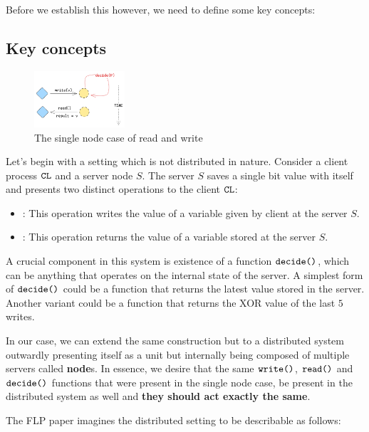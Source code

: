 Before we establish this however, we need to define some key concepts:

\subsection{Key concepts}

\begin{figure}
    \centering
    \includegraphics[width=0.30\textwidth]{general-problems/assets/flp-single-node-read-write.png}
    \caption{The single node case of read and write}
    \label{fig:flp-single-node-read-write}
\end{figure}

Let's begin with a setting which is not distributed in nature. Consider a client process $\verb|CL|$ and a server node $S$. The server $S$ saves a single bit value with itself and presents two distinct operations to the client $\verb|CL|$: 
\begin{itemize}
    \item {}: This operation writes the value of a variable given by client at the server $S$.
    \item {}: This operation returns the value of a variable stored at the server $S$.
\end{itemize}

A crucial component in this system is existence of a function $\verb|decide()|$, which can be anything that operates on the internal state of the server. A simplest form of $\verb|decide()|$ could be a function that returns the latest value stored in the server. Another variant could be a function that returns the XOR value of the last $5$ writes.

In our case, we can extend the same construction but to a distributed system outwardly presenting itself as a unit but internally being composed of multiple servers called \textbf{node}s. In essence, we desire that the same $\verb|write()|$, $\verb|read()|$ and $\verb|decide()|$ functions that were present in the single node case, be present in the distributed system as well and \textbf{they should act exactly the same}.

The FLP paper imagines the distributed setting to be describable as follows:

